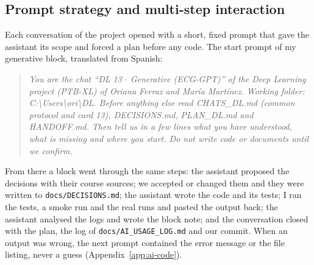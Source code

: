 \subsection{Prompt strategy and multi-step interaction}

Each conversation of the project opened with a short, fixed prompt that gave the assistant its scope and
forced a plan before any code. The start prompt of my generative block, translated from Spanish:
\begin{quote}\small\itshape
You are the chat ``DL 13 $\cdot$ Generative (ECG-GPT)'' of the Deep Learning project (PTB-XL) of Oriana
Ferraz and Mar\'ia Mart\'inez. Working folder: C:\textbackslash Users\textbackslash ori\textbackslash DL.
Before anything else read CHATS\_DL.md (common protocol and card 13), DECISIONS.md, PLAN\_DL.md and
HANDOFF.md. Then tell us in a few lines what you have understood, what is missing and where you start.
Do not write code or documents until we confirm.
\end{quote}
From there a block went through the same steps: the assistant proposed the decisions with their course
sources; we accepted or changed them and they were written to \texttt{docs/DECISIONS.md}; the assistant
wrote the code and its tests; I ran the tests, a smoke run and the real runs and pasted the output back;
the assistant analysed the logs and wrote the block note; and the conversation closed with the plan, the
log of \texttt{docs/AI\_USAGE\_LOG.md} and our commit. When an output was wrong, the next prompt contained
the error message or the file listing, never a guess (Appendix~\ref{app:ai-code}).
